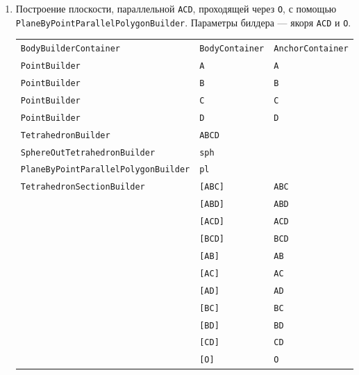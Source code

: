 \documentclass[fontsize=10px, a4paper, openany]{scrbook}
\begin{document}
\begin{enumerate}
\pagebreak

\item Построение плоскости, параллельной \texttt{ACD}, проходящей через \texttt{O}, с помощью\\ \texttt{PlaneByPointParallelPolygonBuilder}. Параметры билдера --- якоря \texttt{ACD} и \texttt{O}.

\begin{table}[h!]
\centering
\begin{tabular}{lll}
\texttt{BodyBuilderContainer}                 & \texttt{BodyContainer} & \texttt{AnchorContainer} \\
\texttt{PointBuilder} & \texttt{A}    & \texttt{A}      \\
\texttt{PointBuilder} & \texttt{B}    & \texttt{B}      \\
\texttt{PointBuilder} & \texttt{C}    & \texttt{C}      \\
\texttt{PointBuilder} & \texttt{D}    & \texttt{D}      \\
\texttt{TetrahedronBuilder} & \texttt{ABCD} & \\
\texttt{SphereOutTetrahedronBuilder} & \texttt{sph}              & \\
\cellcolor[HTML]{68CBD0}\texttt{PlaneByPointParallelPolygonBuilder}   & \cellcolor[HTML]{68CBD0}\texttt{pl} & \\
\texttt{TetrahedronSectionBuilder} & \texttt{[ABC]} & \texttt{ABC} \\
 & \texttt{[ABD]} & \texttt{ABD} \\
 & \texttt{[ACD]} & \texttt{ACD} \\
 & \texttt{[BCD]} & \texttt{BCD} \\
 & \texttt{[AB]} & \texttt{AB} \\
 & \texttt{[AC]} & \texttt{AC} \\
 & \texttt{[AD]} & \texttt{AD} \\
 & \texttt{[BC]} & \texttt{BC} \\
 & \texttt{[BD]} & \texttt{BD} \\
 & \texttt{[CD]} & \texttt{CD} \\
 & \texttt{[O]}  & \texttt{O} \\
\end{tabular}
\end{table}

\begin{center}
\end{center}


\end{enumerate}
\end{document}
